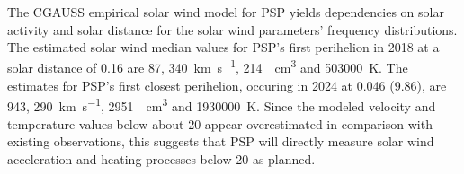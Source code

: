 {The CGAUSS empirical solar wind model for PSP yields dependencies on solar activity and solar distance for the solar wind parameters' frequency distributions. The estimated solar wind median values for PSP’s first perihelion in 2018 at a solar distance of \SI{0.16}{\au} are \SI{87}{\nT}, \SI{340}{\km\per\s}, \SI{214}{\per\cm\cubed} and \SI{503000}{\K}. The estimates for PSP’s first closest perihelion, occuring in 2024 at \SI{0.046}{\au} (\SI{9.86}{\Rs}), are \SI{943}{\nT}, \SI{290}{\km\per\s}, \SI{2951}{\per\cm\cubed} and \SI{1930000}{\K}. Since the modeled velocity and temperature values below about \SI{20}{\Rs} appear overestimated in comparison with existing observations, this suggests that PSP will directly measure solar wind acceleration and heating processes below \SI{20}{\Rs} as planned.}	%
{}	%

% 
% 




